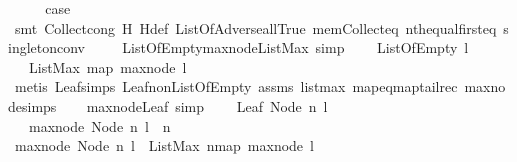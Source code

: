 \begin{isabellebody}
\ \ \isamarkupfalse%
\ \isamarkupfalse%
\ {\isacharquery}case\isanewline
\ \ \ \ \isamarkupfalse%
\ {\isacharparenleft}smt\ Collect{\isacharunderscore}cong\ H{\isacharunderscore}{}\ H{\isacharunderscore}def\ ListOfAdverse{\isacharunderscore}all{\isacharunderscore}True\ mem{\isacharunderscore}Collect{\isacharunderscore}eq\ nth{\isacharunderscore}equal{\isacharunderscore}first{\isacharunderscore}eq\ singleton{\isacharunderscore}conv{\isacharparenright}\ \isanewline
{}\isamarkupfalse%
%
\endisatagproof
{\isafoldproof}%
%
\isadelimproof
\isanewline
%
\endisadelimproof
\ \ \isanewline
{}\isamarkupfalse%
\ ListOfEmpty{\isacharunderscore}max{\isacharunderscore}node{\isacharunderscore}ListMax{\isacharunderscore}{}\ {\isacharbrackleft}simp{\isacharbrackright}{\isacharcolon}\ \isanewline
\ \ \ {\isachardoublequoteopen}ListOfEmpty\ l{\isachardoublequoteclose}\ \isanewline
\ \ \ {\isachardoublequoteopen}ListMax\ {\isacharparenleft}map\ max{\isacharunderscore}node\ l{\isacharparenright}\ {\isacharequal}\ {}{\isachardoublequoteclose}\isanewline
%
\isadelimproof
\ \ %
\endisadelimproof
%
\isatagproof
{}\isamarkupfalse%
\ {\isacharparenleft}metis\ Leaf{\isachardot}simps\ Leaf{\isacharunderscore}non{\isacharunderscore}ListOfEmpty\ assms\ listmax{\isacharunderscore}{}\ map{\isacharunderscore}eq{\isacharunderscore}map{\isacharunderscore}tailrec\ max{\isacharunderscore}node{\isachardot}simps{\isacharparenleft}{}{\isacharparenright}{\isacharparenright}%
\endisatagproof
{\isafoldproof}%
%
\isadelimproof
\isanewline
%
\endisadelimproof
\ \ \isanewline
{}\isamarkupfalse%
\ max{\isacharunderscore}node{\isacharunderscore}Leaf\ {\isacharbrackleft}simp{\isacharbrackright}{\isacharcolon}\ \isanewline
\ \ \ {\isachardoublequoteopen}Leaf\ {\isacharparenleft}Node\ n\ l{\isacharparenright}{\isachardoublequoteclose}\ \isanewline
\ \ \ {\isachardoublequoteopen}max{\isacharunderscore}node\ {\isacharparenleft}Node\ n\ l{\isacharparenright}\ {\isacharequal}\ n{\isachardoublequoteclose}\ \ \ \ \isanewline
%
\isadelimproof
%
\endisadelimproof
%
\isatagproof
{}\isamarkupfalse%
\ {\isacharminus}\isanewline
\ \ \isamarkupfalse%
\ {\isachardoublequoteopen}max{\isacharunderscore}node\ {\isacharparenleft}Node\ n\ l{\isacharparenright}\ {\isacharequal}\ ListMax\ {\isacharparenleft}n{\isacharhash}{\isacharparenleft}map\ max{\isacharunderscore}node\ l{\isacharparenright}{\isacharparenright}{\isachardoublequoteclose}\ \isamarkupfalse%

\end{isabellebody}
